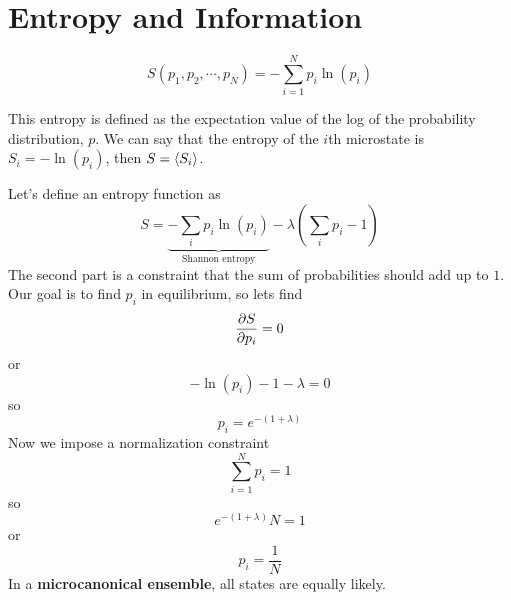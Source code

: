 \documentclass[a4paper,twoside,master.tex]{subfiles}
\begin{document}

\section{Entropy and Information}\label{sec:entropy_and_information}

\begin{equation}
    S(p_1, p_2, \cdots, p_N) = - \sum_{i=1}^{N} p_i \ln(p_i) \tag{Shannon/Information Entropy}
\end{equation}

This entropy is defined as the expectation value of the log of the probability distribution, $ p $. We can say that the entropy of the $ i $th microstate is $ S_i = - \ln(p_i) $, then $ S = \ev{S_i} $.

Let's define an entropy function as
\begin{equation}
    S = \underbrace{- \sum_i p_i \ln(p_i)}_{\text{Shannon entropy}} - \lambda \left( \sum_i p_i - 1 \right)
\end{equation}
The second part is a constraint that the sum of probabilities should add up to $ 1 $. Our goal is to find $ p_i $ in equilibrium, so lets find
\begin{equation}
    \pdv{S}{p_i} = 0
\end{equation}
or
\begin{equation}
    - \ln(p_i) - 1 - \lambda = 0
\end{equation}
so
\begin{equation}
    p_i =e^{-(1 + \lambda)}
\end{equation}
Now we impose a normalization constraint
\begin{equation}
    \sum_{i=1}^{N} p_i = 1
\end{equation}
so
\begin{equation}
    e^{-(1+ \lambda)} N = 1
\end{equation}
or
\begin{equation}
    p_i = \frac{1}{N}
\end{equation}
In a \textbf{microcanonical ensemble}, all states are equally likely.
\end{document}
